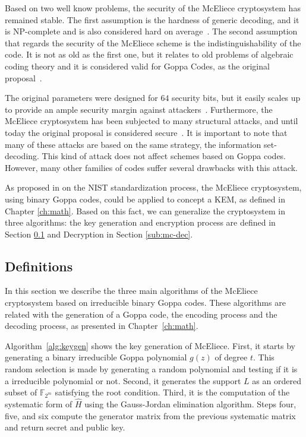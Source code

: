 Based on two well know problems, the security of the McEliece cryptosystem has remained stable. The first assumption is the hardness of generic decoding, and it is NP-complete and is also considered hard on average~\cite{berlekamp1978inherent}. The second assumption that regards the security of the McEliece scheme is the indistinguishability of the code. It is not as old as the first one, but it relates to old problems of algebraic coding theory and it is considered valid for Goppa Codes, as the original proposal~\cite{faugere2013distinguisher}. 

The original parameters were designed for ${64}$ security bits, but it easily scales up to provide an ample security margin against attackers~\cite{canteaut1998cryptanalysis}. Furthermore, the McEliece cryptosystem has been subjected to many structural attacks, and until today the original proposal is considered secure~\cite{bernstein2008attacking}. It is important to note that many of these attacks are based on the same strategy, the information set-decoding. This kind of attack does not affect schemes based on Goppa codes. However, many other families of codes suffer several drawbacks with this attack. 


As proposed in \cite{bernstein2017classic, bardet2017big} on the NIST standardization process, the McEliece cryptosystem, using binary Goppa codes, could be applied to concept a KEM, as defined in Chapter \ref{ch:math}. Based on this fact, we can generalize the cryptosystem in three algorithms: the key generation and encryption process are defined in Section \ref{sub:mc-def} and Decryption in Section \ref{sub:mc-dec}.

\subsection{Definitions}
\label{sub:mc-def}
In this section we describe the three main algorithms of the McEliece cryptosystem based on irreducible binary Goppa codes. These algorithms are related with the generation of a Goppa code, the encoding process and the decoding process, as presented in Chapter~\ref{ch:math}.

Algorithm~\ref{alg:keygen} shows the key generation of McEliece. First, it starts by generating a binary irreducible Goppa polynomial $g(z)$ of degree $t$. This random selection is made by generating a random polynomial and testing if it is a irreducible polynomial or not. Second, it generates the support $L$ as an ordered subset of $\mathbb{F}_{2^m}$ satisfying the root condition. Third, it is the computation of the systematic form of $\hat{H}$ using the Gauss-Jordan elimination algorithm. Steps four, five, and six compute the generator matrix from the previous systematic matrix and return secret and public key.


